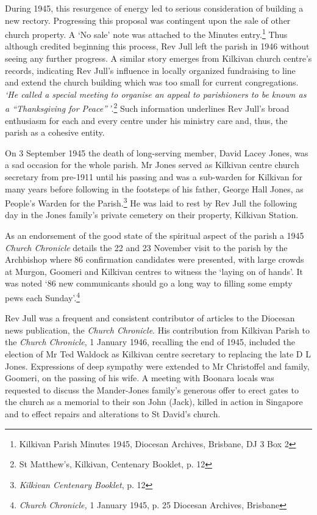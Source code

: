 During 1945, this resurgence of energy led to serious consideration of building a new rectory. Progressing this proposal was contingent upon the sale of other church property. A `No sale' note was attached to the Minutes entry.\footnote{Kilkivan Parish Minutes 1945, Diocesan Archives, Brisbane, DJ 3 Box 2} Thus although credited beginning this process, Rev Jull left the parish in 1946 without seeing any further progress. A similar story emerges from Kilkivan church centre's records, indicating Rev Jull's influence in locally organized fundraising to line and extend the church building which was too small for current congregations. \emph{`He called a special meeting to organise an appeal to parishioners to be known as a ``Thanksgiving for Peace''\,'}.\footnote{St Matthew's, Kilkivan, Centenary Booklet, p. 12} Such information underlines Rev Jull's broad enthusiasm for each and every centre under his ministry care and, thus, the parish as a cohesive entity.

On 3 September 1945 the death of long-serving member, David Lacey Jones, was a sad occasion for the whole parish. Mr Jones served as Kilkivan centre church secretary from pre-1911 until his passing and was a sub-warden for Kilkivan for many years before following in the footsteps of his father, George Hall Jones, as People's Warden for the Parish.\footnote{\emph{Kilkivan Centenary Booklet}, p. 12} He was laid to rest by Rev Jull the following day in the Jones family's private cemetery on their property, Kilkivan Station.

As an endorsement of the good state of the spiritual aspect of the parish a 1945 \emph{Church Chronicle} details the 22 and 23 November visit to the parish by the Archbishop where 86 confirmation candidates were presented, with large crowds at Murgon, Goomeri and Kilkivan centres to witness the `laying on of hands'. It was noted `86 new communicants should go a long way to filling some empty pews each Sunday'.\footnote{\emph{Church Chronicle,} 1 January 1945, p. 25 Diocesan Archives, Brisbane}

Rev Jull was a frequent and consistent contributor of articles to the Diocesan news publication, the \emph{Church Chronicle}. His contribution from Kilkivan Parish to the \emph{Church Chronicle}, 1 January 1946, recalling the end of 1945, included the election of Mr Ted Waldock as Kilkivan centre secretary to replacing the late D L Jones. Expressions of deep sympathy were extended to Mr Christoffel and family, Goomeri, on the passing of his wife. A meeting with Boonara locals was requested to discuss the Mander-Jones family's generous offer to erect gates to the church as a memorial to their son John (Jack), killed in action in Singapore and to effect repairs and alterations to St David's church.


